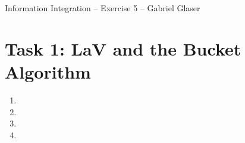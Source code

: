 \documentclass{scrartcl}
\begin{document}
	\begin{center}
		\LARGE
		Information Integration -- Exercise 5 -- Gabriel Glaser
	\end{center}
	
	\section*{Task 1: LaV and the Bucket Algorithm}
	\begin{enumerate}
		\item
		\item
		\item
		\item
	\end{enumerate}
	
\end{document}
